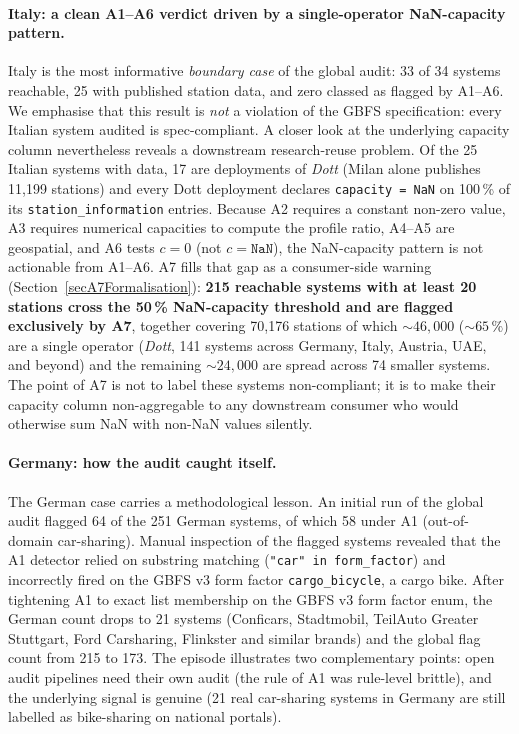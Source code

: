 \documentclass[11pt,a4paper]{article}
\begin{document}
\paragraph{Italy: a clean A1--A6 verdict driven by a single-operator NaN-capacity pattern.}
Italy is the most informative \emph{boundary case} of the global
audit: 33 of 34 systems reachable, 25 with published station data,
and zero classed as flagged by A1--A6. We emphasise that this
result is \emph{not} a violation of the GBFS specification: every
Italian system audited is spec-compliant. A closer look at the
underlying capacity column nevertheless reveals a downstream
research-reuse problem. Of the 25 Italian systems with data, 17 are
deployments of \emph{Dott} (Milan alone publishes 11{,}199
stations) and every Dott deployment declares \texttt{capacity =
NaN} on 100\,\% of its \texttt{station\_information} entries.
Because A2 requires a constant non-zero value, A3 requires
numerical capacities to compute the profile ratio, A4--A5 are
geospatial, and A6 tests $c = 0$ (not $c = \texttt{NaN}$), the
NaN-capacity pattern is not actionable from A1--A6. A7 fills that
gap as a consumer-side warning (Section~\ref{secA7Formalisation}):
\textbf{215 reachable systems with at least 20 stations cross the
50\,\% NaN-capacity threshold and are flagged exclusively by A7},
together covering 70{,}176 stations of which $\sim 46{,}000$
($\sim 65\,\%$) are a single operator (\emph{Dott}, 141 systems
across Germany, Italy, Austria, UAE, and beyond) and the remaining
$\sim 24{,}000$ are spread across 74 smaller systems. The point of
A7 is not to label these systems non-compliant; it is to make
their capacity column non-aggregable to any downstream consumer
who would otherwise sum NaN with non-NaN values silently.

\paragraph{Germany: how the audit caught itself.}
The German case carries a methodological lesson. An initial run of
the global audit flagged 64 of the 251 German systems, of which 58
under A1 (out-of-domain car-sharing). Manual inspection of the
flagged systems revealed that the A1 detector relied on substring
matching (\texttt{"car" in form\_factor}) and incorrectly fired on
the GBFS v3 form factor \texttt{cargo\_bicycle}, a cargo bike. After
tightening A1 to exact list membership on the GBFS v3 form factor
enum, the German count drops to 21 systems (Conficars, Stadtmobil,
TeilAuto Greater Stuttgart, Ford Carsharing, Flinkster and similar
brands) and the global flag count from 215 to 173. The episode
illustrates two complementary points: open audit pipelines need
their own audit (the rule of A1 was rule-level brittle), and the
underlying signal is genuine (21 real car-sharing systems in
Germany are still labelled as bike-sharing on national portals).
\end{document}
